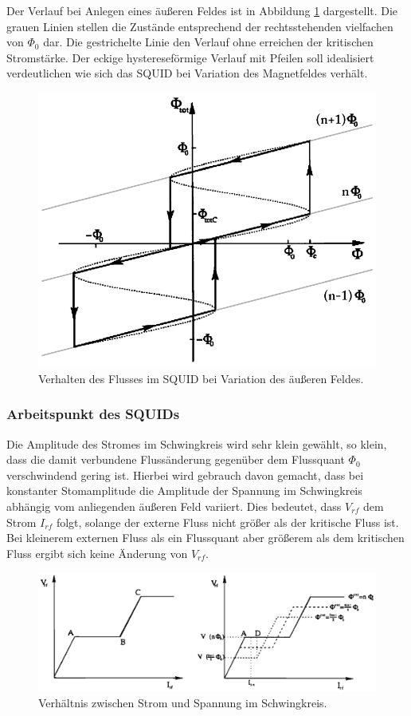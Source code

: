 \documentclass[12pt]{article}
\begin{document}
Der Verlauf bei Anlegen eines äußeren Feldes ist in Abbildung \ref{verlauf} dargestellt. Die grauen Linien stellen die Zustände entsprechend der rechtsstehenden vielfachen von $\Phi_0$ dar. Die gestrichelte Linie den Verlauf ohne erreichen der kritischen Stromstärke. Der eckige hystereseförmige Verlauf mit Pfeilen soll idealisiert verdeutlichen wie sich das SQUID bei Variation des Magnetfeldes verhält. 
\begin{figure}[H]
\centering
\includegraphics[width=0.9\linewidth]{pictures/squid_feld_verlauf.eps}
\caption{Verhalten des Flusses im SQUID bei Variation des äußeren Feldes.}
\label{verlauf}
\end{figure}

\subsubsection{Arbeitspunkt des SQUIDs}
Die Amplitude des Stromes im Schwingkreis wird sehr klein gewählt, so klein, dass die damit verbundene Flussänderung gegenüber dem Flussquant 
$\Phi_0$ verschwindend gering ist. Hierbei wird gebrauch davon gemacht, dass bei konstanter Stomamplitude die Amplitude der Spannung im Schwingkreis abhängig vom anliegenden äußeren Feld variiert. Dies bedeutet, dass $V_{rf}$ dem Strom $I_{rf}$ folgt, solange der externe Fluss
nicht größer als der kritische Fluss ist. Bei kleinerem externen Fluss als ein Flussquant aber größerem
als dem kritischen Fluss ergibt sich keine Änderung von $V_{rf}$. 
\begin{figure}[H]
\centering
\includegraphics[width=0.9\linewidth]{pictures/squid_strom_verlauf.eps}
\caption{Verhältnis zwischen Strom und Spannung im Schwingkreis.}
\end{figure}
\end{document}
